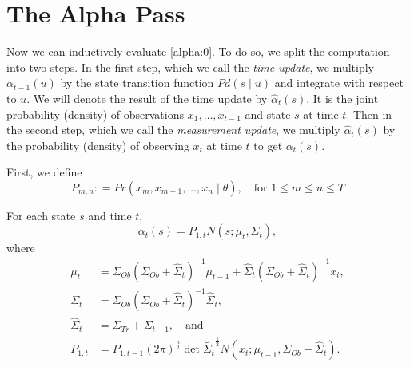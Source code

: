 \documentclass[12pt,leqno]{article}
\begin{document}
\section{The Alpha Pass}
  Now we can inductively evaluate \eqref{alpha:0}. To do so, we split the computation
  into two steps.  In the first step, which we call the {\em time update}, we multiply
  $\alpha_{t-1}(u)$ by the state transition function $Pd(s\mid u)$ and integrate with respect
  to $u$. We will denote the result of the time update by $\hat{\alpha}_t(s)$.  It is the joint probability
  (density) of observations $x_1,\dots,x_{t-1}$ and state $s$ at time $t$.
  Then in the second step, which we call the {\em measurement update}, we multiply
  $\hat{\alpha}_t(s)$ by the probability (density) of observing $x_t$ at time $t$ to get $\alpha_t(s)$.

  First, we define
$$
P_{m,n}: = Pr(x_m,x_{m+1},\dots,x_n \mid \theta),\quad\text{for $1\le m \le n\le T$}
$$
\begin{Thm}\label{alpha:1}
  For each state $s$ and time $t$,
$$
  \alpha_t(s) = P_{1,t}N(s;\mu_t,\Sigma_t),
$$
where
\begin{align*}
  \mu_t &= \Sigma_{Ob}(\Sigma_{Ob}+\widehat{\Sigma}_t)^{-1}\mu_{t-1}
  + \widehat{\Sigma}_t(\Sigma_{Ob}+\widehat{\Sigma}_t)^{-1}x_t, \\
  \Sigma_t &= \Sigma_{Ob}(\Sigma_{Ob}+\widehat{\Sigma}_t)^{-1}\widehat{\Sigma}_t,\\
  \widehat{\Sigma}_t &= \Sigma_{Tr}+\Sigma_{t-1},
 \quad\text{and}\\
  P_{1,t} &=P_{1,t-1}(2\pi)^{\frac{n}{2}}\det{\widetilde{\Sigma_t}}^{\frac{1}{2}}
  N(x_t;\mu_{t-1},\Sigma_{Ob} + \widehat{\Sigma}_t).
\end{align*}
\end{Thm}
\end{document}
